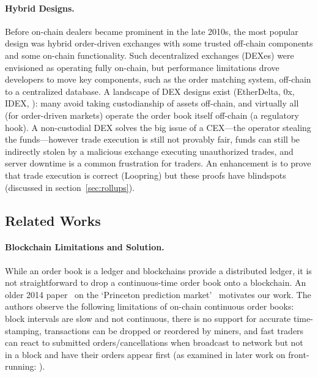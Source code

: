\paragraph{Hybrid Designs.} Before on-chain dealers became prominent in the late 2010s, the most popular design was hybrid order-driven exchanges with some trusted off-chain components and some on-chain functionality. Such decentralized exchanges (DEXes) were envisioned as operating fully on-chain, but performance limitations drove developers to move key components, such as the order matching system, off-chain to a centralized database. A landscape of DEX designs exist (\eg EtherDelta, 0x, IDEX, \etc): many avoid taking custodianship of assets off-chain, and virtually all (for order-driven markets) operate the order book itself off-chain (a regulatory hook). A non-custodial DEX solves the big issue of a CEX---the operator stealing the funds---however trade execution is still not provably fair, funds can still be indirectly stolen by a malicious exchange executing unauthorized trades, and server downtime is a common frustration for traders. An enhancement is to prove that trade execution is correct (\eg Loopring) but these proofs have blindspots (discussed in section~\ref{sec:rollups}). 

\subsection{Related Works}

\paragraph{Blockchain Limitations and Solution.} While an order book is a ledger and blockchains provide a distributed ledger, it is not straightforward to drop a continuous-time order book onto a blockchain. An older 2014 paper~\cite{clark2014decentralizing} on the `Princeton prediction market'~\cite{Bra13} motivates our work. The authors observe the following limitations of on-chain continuous order books: block intervals are slow and not continuous, there is no support for accurate time-stamping, transactions can be dropped or reordered by miners, and fast traders can react to submitted orders/cancellations when broadcast to network but not in a block and have their orders appear first (as examined in later work on front-running: \cite{eskandari2019sok,daian2019flash}).

